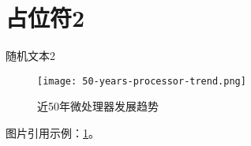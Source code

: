 





\ThesisSingleAppendix

\section{占位符2}

随机文本2

\begin{figure}[htb]
    \texttt{[image: 50-years-processor-trend.png]}
    \caption[处理器发展]{近50年微处理器发展趋势} %
    \label{fig:processor-trend}
\end{figure}

图片引用示例：\cref{fig:processor-trend}。
